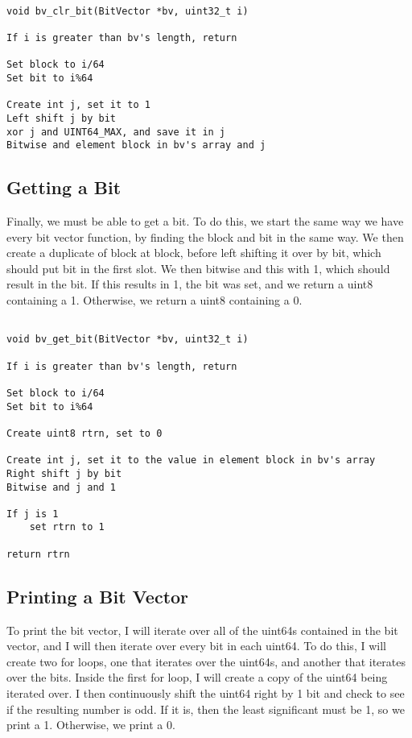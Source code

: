 \documentclass[11pt]{article}
\begin{document}
\begin{verbatim}

void bv_clr_bit(BitVector *bv, uint32_t i)

If i is greater than bv's length, return

Set block to i/64
Set bit to i%64

Create int j, set it to 1
Left shift j by bit
xor j and UINT64_MAX, and save it in j
Bitwise and element block in bv's array and j

\end{verbatim}

\subsection{Getting a Bit}

Finally, we must be able to get a bit. To do this, we start the same way we have every bit vector function, by finding the block and bit in the same way. We then create a duplicate of block at block, before left shifting it over by bit, which should put bit in the first slot. We then bitwise and this with 1, which should result in the bit. If this results in 1, the bit was set, and we return a uint8 containing a 1. Otherwise, we return a uint8 containing a 0.

\begin{verbatim}

void bv_get_bit(BitVector *bv, uint32_t i)

If i is greater than bv's length, return

Set block to i/64
Set bit to i%64

Create uint8 rtrn, set to 0

Create int j, set it to the value in element block in bv's array
Right shift j by bit
Bitwise and j and 1

If j is 1
    set rtrn to 1

return rtrn

\end{verbatim}

\subsection{Printing a Bit Vector}

To print the bit vector, I will iterate over all of the uint64s contained in the bit vector, and I will then iterate over every bit in each uint64. To do this, I will create two for loops, one that iterates over the uint64s, and another that iterates over the bits. Inside the first for loop, I will create a copy of the uint64 being iterated over. I then continuously shift the uint64 right by 1 bit and check to see if the resulting number is odd. If it is, then the least significant must be 1, so we print a 1. Otherwise, we print a 0.
\end{document}
